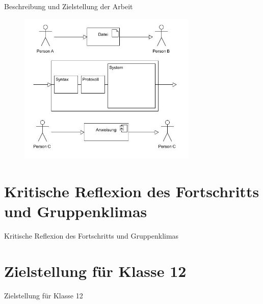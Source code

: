 \documentclass{beamer}
\begin{document}
\begin{frame}{Beschreibung und Zielstellung der Arbeit}
\begin{figure}
\includegraphics[width=8.5cm]{s5.jpg}
\end{figure}
\end{frame}


\section{Kritische Reflexion des Fortschritts und Gruppenklimas}

\begin{frame}{Kritische Reflexion des Fortschritts und Gruppenklimas}

\end{frame}

\section{Zielstellung für Klasse 12}

\begin{frame}{Zielstellung für Klasse 12}

\end{frame}
\end{document}
